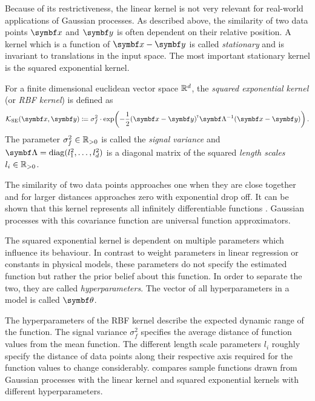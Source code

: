 Because of its restrictiveness, the linear kernel is not very relevant for real-world applications of Gaussian processes.
As described above, the similarity of two data points $\mat{x}$ and $\mat{y}$ is often dependent on their relative position.
A kernel which is a function of $\mat{x} - \mat{y}$ is called \emph{stationary} and is invariant to translations in the input space.
The most important stationary kernel is the squared exponential kernel.
\begin{definition}
    \label{def:rbf_kernel}
    For a finite dimensional euclidean vector space $\mathbb{R}^d$, the \emph{squared exponential kernel} (or \emph{RBF kernel}) is defined as
    \begin{align}
        \K_{\text{SE}}(\mat{x}, \mat{y}) \coloneqq \sigma_f^2 \cdot \exp\!\left( -\frac{1}{2} (\mat{x} - \mat{y})\tran \mat{\Lambda}^{-1} (\mat{x} - \mat{y}) \right).
    \end{align}
    The parameter $\sigma_f^2 \in \mathbb{R}_{>0}$ is called the \emph{signal variance} and $\mat{\Lambda} = \diag(l_1^2, \dots, l_d^2)$ is a diagonal matrix of the squared \emph{length scales} $l_i \in \mathbb{R}_{>0}$.
\end{definition}
The similarity of two data points approaches one when they are close together and for larger distances approaches zero with exponential drop off.
It can be shown that this kernel represents all infinitely differentiable functions \cite{rasmussen_gaussian_2006}.
Gaussian processes with this covariance function are universal function approximators.

The squared exponential kernel is dependent on multiple parameters which influence its behaviour.
In contrast to weight parameters in linear regression or constants in physical models, these parameters do not specify the estimated function but rather the prior belief about this function.
In order to separate the two, they are called \emph{hyperparameters}.
The vector of all hyperparameters in a model is called $\mat{\theta}$.

The hyperparameters of the RBF kernel describe the expected dynamic range of the function.
The signal variance $\sigma_f^2$ specifies the average distance of function values from the mean function.
The different length scale parameters $l_i$ roughly specify the distance of data points along their respective axis required for the function values to change considerably.
 compares sample functions drawn from Gaussian processes with the linear kernel and squared exponential kernels with different hyperparameters.


